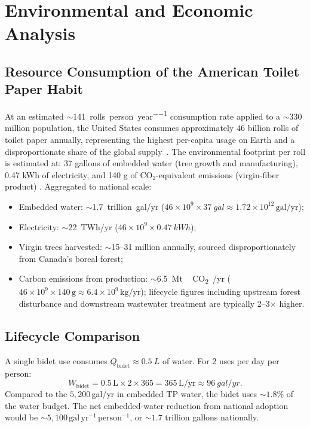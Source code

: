 \documentclass[aps,prfluids,reprint,amsmath,amssymb,floatfix]{revtex4-2}
\begin{document}
\section{Environmental and Economic Analysis}
\label{sec:enviro}

\subsection{Resource Consumption of the American Toilet Paper Habit}

At an estimated $\sim$\SI{141}{rolls\per person\per year} consumption rate
applied to a $\sim 330$ million population, the United States consumes
approximately $46$ billion rolls of toilet paper annually, representing
the highest per-capita usage on Earth and a disproportionate share of
the global supply~\citep{ScientificAmerican2009}. The environmental
footprint per roll is estimated at: 37 gallons of embedded water (tree
growth and manufacturing), 0.47 kWh of electricity, and 140 g of
CO$_2$-equivalent emissions (virgin-fiber product) \citep{NRDC2020}.
Aggregated to national scale:
\begin{itemize}[leftmargin=*]
    \item Embedded water: $\sim$\SI{1.7}{trillion gal/yr}
    ($46 \times 10^9 \times \SI{37}{gal} \approx
    1.72 \times 10^{12}\,\mathrm{gal/yr}$);
    \item Electricity: $\sim$\SI{22}{TWh/yr}
    ($46 \times 10^9 \times \SI{0.47}{kWh}$);
    \item Virgin trees harvested: $\sim$15--31 million annually, sourced
    disproportionately from Canada's boreal forest;
    \item Carbon emissions from production:
    $\sim$\SI{6.5}{Mt\,CO_2/yr}
    ($46 \times 10^9 \times 140\,\mathrm{g} \approx
    6.4 \times 10^9\,\mathrm{kg/yr}$); lifecycle figures including
    upstream forest disturbance and downstream wastewater treatment
    are typically 2--3$\times$ higher.
\end{itemize}

\subsection{Lifecycle Comparison}

A single bidet use consumes $Q_\mathrm{bidet} \approx \SI{0.5}{L}$ of water.
For 2 uses per day per person:
\begin{equation}
    W_\mathrm{bidet} = 0.5\,\mathrm{L} \times 2 \times 365 = 365\,\mathrm{L/yr}
    \approx \SI{96}{gal/yr}.
\end{equation}
Compared to the $5{,}200$\,gal/yr in embedded TP water, the bidet uses
$\sim\!1.8\%$ of the water budget. The net embedded-water reduction from
national adoption would be $\sim\!5{,}100\,\mathrm{gal\,yr^{-1}\,person^{-1}}$,
or $\sim\!1.7$ trillion gallons nationally.
\end{document}
